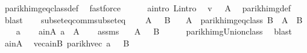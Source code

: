 \begin{isabellebody}
\ parikh{\isacharunderscore}{\kern0pt}img{\isacharunderscore}{\kern0pt}eq{\isacharunderscore}{\kern0pt}class{\isacharunderscore}{\kern0pt}def\ \isamarkupfalse%
\ fastforce\isanewline
\ \ \ \ \isamarkupfalse%
\ a{\isacharunderscore}{\kern0pt}intro\ L{\isacharunderscore}{\kern0pt}intro\ \isamarkupfalse%
\ {\isachardoublequoteopen}v\ {\isasymin}\ {\isasymPsi}\ A{\isachardoublequoteclose}\ \isamarkupfalse%
\ parikh{\isacharunderscore}{\kern0pt}img{\isacharunderscore}{\kern0pt}def\ \isamarkupfalse%
\ blast\isanewline
\ \ \isamarkupfalse%
\isanewline
{}\isamarkupfalse%
%
\endisatagproof
{\isafoldproof}%
%
\isadelimproof
\isanewline
%
\endisadelimproof
\isanewline
{}\isamarkupfalse%
\ subseteq{\isacharunderscore}{\kern0pt}comm{\isacharunderscore}{\kern0pt}subseteq{\isacharcolon}{\kern0pt}\isanewline
\ \ \ {\isachardoublequoteopen}{\isasymPsi}\ A\ {\isasymsubseteq}\ {\isasymPsi}\ B{\isachardoublequoteclose}\isanewline
\ \ \ {\isachardoublequoteopen}A\ {\isasymsubseteq}\ {\isasymUnion}{\isacharparenleft}{\kern0pt}parikh{\isacharunderscore}{\kern0pt}img{\isacharunderscore}{\kern0pt}eq{\isacharunderscore}{\kern0pt}class\ B{\isacharparenright}{\kern0pt}{\isachardoublequoteclose}\ {\isacharparenleft}{\kern0pt}\ {\isachardoublequoteopen}A\ {\isasymsubseteq}\ {\isacharquery}{\kern0pt}B{\isacharprime}{\kern0pt}{\isachardoublequoteclose}{\isacharparenright}{\kern0pt}\isanewline
%
\isadelimproof
%
\endisadelimproof
%
\isatagproof
{}\isamarkupfalse%
\isanewline
\ \ \isamarkupfalse%
\ a\isanewline
\ \ \isamarkupfalse%
\ a{\isacharunderscore}{\kern0pt}in{\isacharunderscore}{\kern0pt}A{\isacharcolon}{\kern0pt}\ {\isachardoublequoteopen}a\ {\isasymin}\ A{\isachardoublequoteclose}\isanewline
\ \ \isamarkupfalse%
\ assms\ \isamarkupfalse%
\ {\isachardoublequoteopen}{\isasymPsi}\ A\ {\isasymsubseteq}\ {\isasymPsi}\ {\isacharquery}{\kern0pt}B{\isacharprime}{\kern0pt}{\isachardoublequoteclose}\isanewline
\ \ \ \ \isamarkupfalse%
\ parikh{\isacharunderscore}{\kern0pt}img{\isacharunderscore}{\kern0pt}Union{\isacharunderscore}{\kern0pt}class\ \isamarkupfalse%
\ blast\isanewline
\ \ \isamarkupfalse%
\ a{\isacharunderscore}{\kern0pt}in{\isacharunderscore}{\kern0pt}A\ \isamarkupfalse%
\ vec{\isacharunderscore}{\kern0pt}a{\isacharunderscore}{\kern0pt}in{\isacharunderscore}{\kern0pt}B{\isacharprime}{\kern0pt}{\isacharcolon}{\kern0pt}\ {\isachardoublequoteopen}parikh{\isacharunderscore}{\kern0pt}vec\ a\ {\isasymin}\ {\isasymPsi}\ {\isacharquery}{\kern0pt}B{\isacharprime}{\kern0pt}{\isachardoublequoteclose}\ \isamarkupfalse%

\end{isabellebody}
